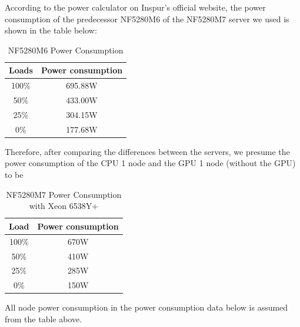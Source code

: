 \documentclass[a4paper,12pt]{article}
\begin{document}
\begin{table}[htbp]
\small
\centering
{}
\caption{Cluster Node Configurations}
\label{tab:node_configs}
\end{table}

According to the power calculator on Inspur's official website, the power consumption of the predecessor NF5280M6 of the NF5280M7 server we used is shown in the table below:
\begin{table}[H]
\centering
\vspace{0.5cm}
\begin{tabular}{cc}
\toprule
Loads & Power consumption \\
\midrule
100\% & 695.88W \\
50\% & 433.00W \\
25\% & 304.15W \\
0\% & 177.68W \\
\bottomrule
\end{tabular}
\caption{NF5280M6 Power Consumption}
\end{table}

Therefore, after comparing the differences between the servers, we presume the power consumption of the CPU 1 node and the GPU 1 node (without the GPU) to be
\begin{table}[H]
\centering
\vspace{0.5cm}
\begin{tabular}{cc}
\toprule
Load & Power consumption \\
\midrule
100\% & 670W \\
50\% & 410W \\
25\% & 285W \\
0\% & 150W \\
\bottomrule
\end{tabular}
\caption{NF5280M7 Power Consumption with Xeon 6538Y+}
\end{table}

All node power consumption in the power consumption data below is assumed from the table above.
\end{document}
